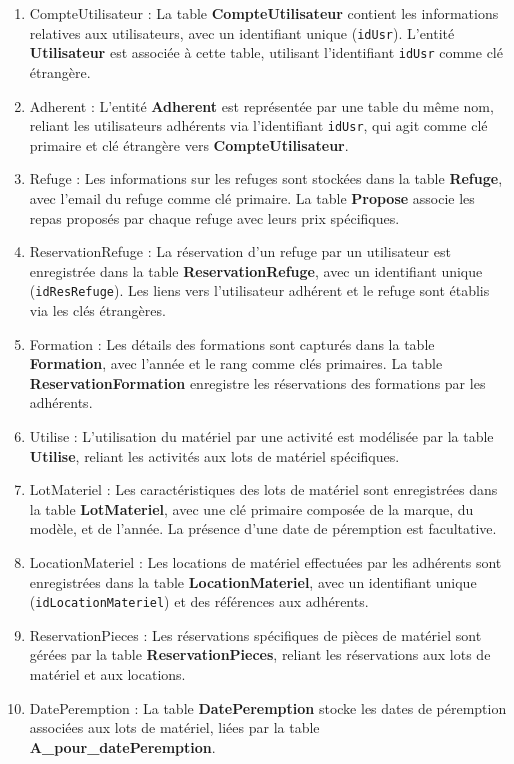 \begin{enumerate}
     


\item    CompteUtilisateur : La table \textbf{CompteUtilisateur} contient les informations relatives aux utilisateurs, avec un identifiant unique (\texttt{idUsr}). L'entité \textbf{Utilisateur} est associée à cette table, utilisant l'identifiant \texttt{idUsr} comme clé étrangère.

\item    Adherent : L'entité \textbf{Adherent} est représentée par une table du même nom, reliant les utilisateurs adhérents via l'identifiant \texttt{idUsr}, qui agit comme clé primaire et clé étrangère vers \textbf{CompteUtilisateur}.

 \item   Refuge : Les informations sur les refuges sont stockées dans la table \textbf{Refuge}, avec l'email du refuge comme clé primaire. La table \textbf{Propose} associe les repas proposés par chaque refuge avec leurs prix spécifiques.

\item    ReservationRefuge : La réservation d'un refuge par un utilisateur est enregistrée dans la table \textbf{ReservationRefuge}, avec un identifiant unique (\texttt{idResRefuge}). Les liens vers l'utilisateur adhérent et le refuge sont établis via les clés étrangères.

\item    Formation : Les détails des formations sont capturés dans la table \textbf{Formation}, avec l'année et le rang comme clés primaires. La table \textbf{ReservationFormation} enregistre les réservations des formations par les adhérents.

\item    Utilise : L'utilisation du matériel par une activité est modélisée par la table \textbf{Utilise}, reliant les activités aux lots de matériel spécifiques.

\item    LotMateriel : Les caractéristiques des lots de matériel sont enregistrées dans la table \textbf{LotMateriel}, avec une clé primaire composée de la marque, du modèle, et de l'année. La présence d'une date de péremption est facultative.

\item    LocationMateriel : Les locations de matériel effectuées par les adhérents sont enregistrées dans la table \textbf{LocationMateriel}, avec un identifiant unique (\texttt{idLocationMateriel}) et des références aux adhérents.

\item    ReservationPieces : Les réservations spécifiques de pièces de matériel sont gérées par la table \textbf{ReservationPieces}, reliant les réservations aux lots de matériel et aux locations.

\item    DatePeremption : La table \textbf{DatePeremption} stocke les dates de péremption associées aux lots de matériel, liées par la table \textbf{A\_pour\_datePeremption}.
\end{enumerate}

